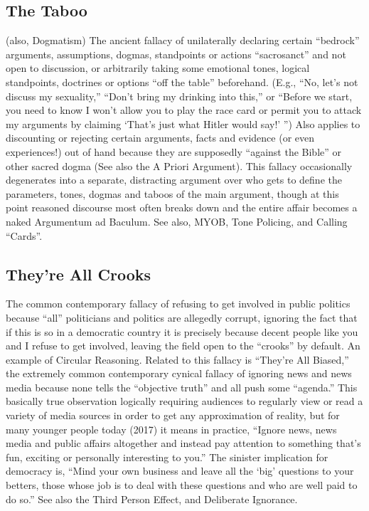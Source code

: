 \documentclass[10pt,a4paper,british]{article}
\begin{document}
\begin{multicols}{2}
    \subsection{The Taboo} (also, Dogmatism) The ancient fallacy of unilaterally declaring certain ``bedrock'' arguments, assumptions, dogmas, standpoints or actions ``sacrosanct'' and not open to discussion, or arbitrarily taking some emotional tones, logical standpoints, doctrines or options ``off the table'' beforehand. (E.g., ``No, let's not discuss my sexuality,'' ``Don't bring my drinking into this,'' or ``Before we start, you need to know I won't allow you to play the race card or permit you to attack my arguments by claiming `That's just what Hitler would say!' '')  Also applies to discounting or rejecting certain arguments, facts and evidence (or even experiences!) out of hand because they are supposedly ``against the Bible'' or other sacred dogma (See also the A Priori Argument). This fallacy occasionally degenerates into a separate, distracting argument over who gets to define the parameters, tones, dogmas and taboos of the main argument, though at this point reasoned discourse most often breaks down and the entire affair becomes a naked Argumentum ad Baculum. See also, MYOB, Tone Policing, and Calling ``Cards''.  

	\subsection{They're All Crooks} The common contemporary fallacy of refusing to get involved in public politics because ``all'' politicians and politics are allegedly corrupt, ignoring the fact that if this is so in a democratic country it is precisely because decent people like you and I refuse to get involved, leaving the field open to the ``crooks'' by default. An example of Circular Reasoning. Related to this fallacy is ``They're All Biased,'' the extremely common contemporary cynical fallacy of ignoring news and news media because none tells the ``objective truth'' and all push some ``agenda.''  This basically true observation logically requiring audiences to regularly view or read a variety of media sources in order to get any approximation of reality, but for many younger people today (2017) it means in practice, ``Ignore news, news media and public affairs altogether and instead pay attention to something that's fun, exciting or personally interesting to you.'' The sinister implication for democracy is, ``Mind your own business and leave all the `big' questions to your betters, those whose job is to deal with these questions and who are well paid to do so.'' See also the Third Person Effect, and Deliberate Ignorance.  


\end{multicols}
\end{document}
